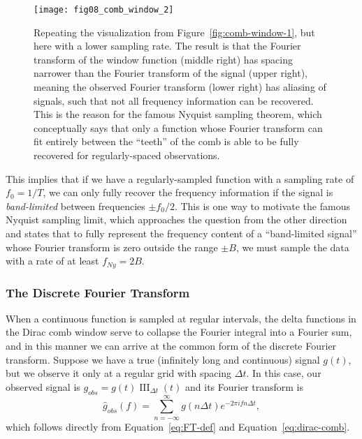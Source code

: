 \documentclass[preprint]{aastex}
\DeclareMathOperator{\III}{III}
\newcommand{\fig}[1]{Figure~\ref{fig:#1}}
\newcommand{\figlabel}[1]{\label{fig:#1}}
\newcommand{\Eq}[1]{Equation~\ref{eq:#1}}
\newcommand{\eq}[1]{\Eq{#1}}
\newcommand{\eqlabel}[1]{\label{eq:#1}}
\begin{document}
\begin{figure}[ht]
  \centering
  \texttt{[image: fig08\_comb\_window\_2]}
  \caption{Repeating the visualization from \fig{comb-window-1}, but here with
    a lower sampling rate. The result is that the Fourier transform of the
    window function (middle right) has spacing narrower than the Fourier
    transform of the signal (upper right), meaning the observed Fourier
    transform (lower right) has
    aliasing of signals, such that not all frequency information can be
    recovered. This is the reason for the famous Nyquist sampling theorem,
    which conceptually says that only a function whose Fourier transform can
    fit entirely between the ``teeth'' of the comb is able to be fully
    recovered for regularly-spaced observations.
    \figlabel{comb-window-2}}
\end{figure}

This implies that if we have a regularly-sampled function with a sampling
rate of $f_0 = 1/T$, we can only fully recover the frequency information
if the signal is {\it band-limited} between frequencies $\pm f_0/2$.
This is one way to motivate the famous Nyquist sampling limit, which
approaches the question from the other direction and states
that to fully represent the frequency content of a ``band-limited signal''
whose Fourier transform is zero outside the range $\pm B$,
we must sample the data with a rate of at least $f_{Ny} = 2B$.

\subsubsection{The Discrete Fourier Transform}
When a continuous function is sampled at regular intervals, the delta functions
in the Dirac comb window serve to collapse the Fourier integral into a Fourier
sum, and in this manner we can arrive at the common form of the discrete Fourier
transform.
Suppose we have a true (infinitely long and continuous) signal $g(t)$, but
we observe it only at a regular grid with spacing $\Delta t$. In this case, our
observed signal is $g_{obs} = g(t) \III_{\Delta t}(t)$ and its Fourier transform is
\begin{equation}
  \hat{g}_{obs}(f) = \sum_{n=-\infty}^\infty g(n\Delta t) e^{-2\pi i f n \Delta t},
  \eqlabel{DFT-f-inf}
\end{equation}
which follows directly from \eq{FT-def} and \eq{dirac-comb}.
\end{document}
